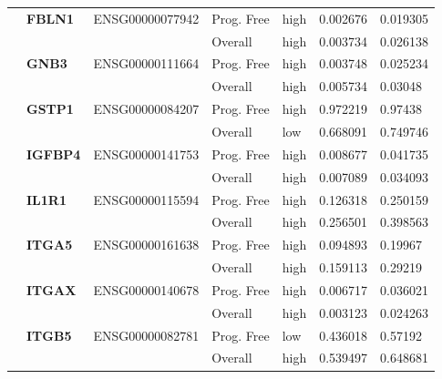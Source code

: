 \begin{spacing}{1}
{\begin{longtable}{|>{\bfseries}p{2cm}|>{\bfseries}p{1.9cm}|p{2.8cm}|p{2cm}|p{2cm}|p{1.5cm}|p{1.5cm}|}
             & FBLN1    & ENSG00000077942 & Prog. Free & high & 0.002676 & 0.019305                \\
            \hhline{~~~----}
             &          &                 & Overall    & high & 0.003734 & 0.026138                \\
            \hhline{~======}
             & GNB3     & ENSG00000111664 & Prog. Free & high & 0.003748 & 0.025234                \\
            \hhline{~~~----}
             &          &                 & Overall    & high & 0.005734 & 0.03048                 \\
            \hhline{~======}
             & GSTP1    & ENSG00000084207 & Prog. Free & high & 0.972219 & 0.97438                 \\
            \hhline{~~~----}
             &          &                 & Overall    & low  & 0.668091 & 0.749746                \\
            \hhline{~======}
             & IGFBP4   & ENSG00000141753 & Prog. Free & high & 0.008677 & 0.041735                \\
            \hhline{~~~----}
             &          &                 & Overall    & high & 0.007089 & 0.034093                \\
            \hhline{~======}
             & IL1R1    & ENSG00000115594 & Prog. Free & high & 0.126318 & 0.250159                \\
            \hhline{~~~----}
             &          &                 & Overall    & high & 0.256501 & 0.398563                \\
            \hhline{~======}
             & ITGA5    & ENSG00000161638 & Prog. Free & high & 0.094893 & 0.19967                 \\
            \hhline{~~~----}
             &          &                 & Overall    & high & 0.159113 & 0.29219                 \\
            \hhline{~======}
             & ITGAX    & ENSG00000140678 & Prog. Free & high & 0.006717 & 0.036021                \\
            \hhline{~~~----}
             &          &                 & Overall    & high & 0.003123 & 0.024263                \\
            \hhline{~======}
             & ITGB5    & ENSG00000082781 & Prog. Free & low  & 0.436018 & 0.57192                 \\
            \hhline{~~~----}
             &          &                 & Overall    & high & 0.539497 & 0.648681                \\

\end{longtable}}
\end{spacing}
